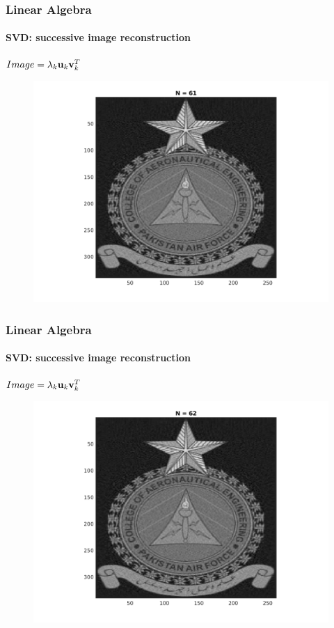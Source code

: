 \documentclass[hyperref={pdfpagelabels=true}]{beamer}
\begin{document}
\begin{frame}
\frametitle{Linear Algebra}
\framesubtitle{SVD: successive image reconstruction} 
\small{
\begin{center}
$Image = \lambda_k{\bf u}_k {\bf v}_k^T$
\end{center}}
\begin{figure}[!htb]
\centering
\includegraphics [scale=0.48]{n/b61.png}
\end{figure}
\end{frame}

\begin{frame}
\frametitle{Linear Algebra}
\framesubtitle{SVD: successive image reconstruction} 
\small{
\begin{center}
$Image = \lambda_k{\bf u}_k {\bf v}_k^T$
\end{center}}
\begin{figure}[!htb]
\centering
\includegraphics [scale=0.48]{n/b62.png}
\end{figure}
\end{frame}
\end{document}
